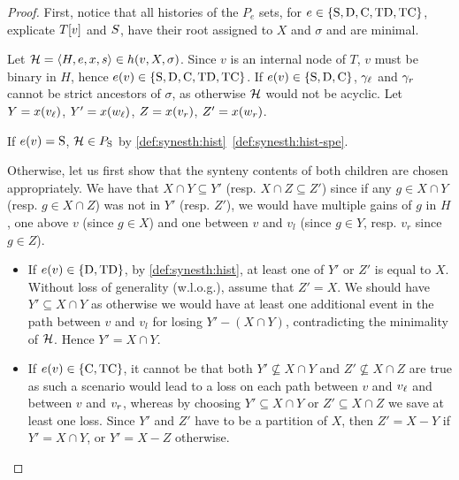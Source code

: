 \begin{proof}
    First, notice that all histories of the \(P_e\) sets,
    for \(e \in \{\mathrm{S},\allowbreak \mathrm{D},\allowbreak \mathrm{C},\allowbreak \mathrm{TD},\allowbreak \mathrm{TC}\}\),
    explicate \(T[v]\) and \(S\),
    have their root assigned to \(X\) and \(\sigma\)
    and are minimal.

    Let \(\mathcal{H} = \left\langle H, e, x, s\right\rangle \in h(v, X, \sigma)\).
    Since \(v\) is an internal node of \(T\), \(v\) must be binary in \(H\), hence \(e(v) \in \{\mathrm{S}, \mathrm{D}, \mathrm{C}, \mathrm{TD}, \mathrm{TC}\}\).
    If \(e(v) \in \{\mathrm{S}, \mathrm{D}, \mathrm{C}\}\), \(\gamma_\mathit{\ell}\) and \(\gamma_r\) cannot be strict ancestors of \(\sigma\), as otherwise \(\mathcal{H}\) would not be acyclic.
    Let \(Y = x(v_\mathit{\ell})\),
    \(Y' = x(w_\mathit{\ell})\),
    \(Z = x(v_r)\),
    \(Z' = x(w_r)\).

    If \(e(v) = \mathrm{S}\),
        \(\mathcal{H} \in P_{\mathrm{S}}\)
        by \cref{def:synesth:hist}~\cref{def:synesth:hist-spe}.

    Otherwise,
        let us first show that the synteny contents of both children are chosen appropriately.
        We have that \(X \cap Y \subseteq Y'\) (resp. \(X \cap Z \subseteq Z'\))
        since if any \(g \in X \cap Y\) (resp. \(g \in X \cap Z\))
        was not in \(Y'\) (resp. \(Z'\)),
        we would have multiple gains of \(g\) in \(H\),
        one above \(v\) (since \(g \in X\))
        and one between \(v\) and \(v_l\) (since \(g \in Y\), resp. \(v_r\) since \(g \in Z\)).
    \begin{itemize}
        \item If \(e(v) \in \{\mathrm{D}, \mathrm{TD}\}\),
            by \cref{def:synesth:hist},
            at least one of \(Y'\) or \(Z'\) is equal to \(X\).
            Without loss of generality (w.l.o.g.), assume that \(Z' = X\).
            We should have \(Y' \subseteq X \cap Y\)
            as otherwise we would have at least one additional event in the path between \(v\) and \(v_l\)
            for losing \(Y' - (X \cap Y)\),
            contradicting the minimality of \(\mathcal{H}\).
            Hence \(Y' = X \cap Y\).

        \item If \(e(v) \in \{\mathrm{C}, \mathrm{TC}\}\),
            it cannot be that both \(Y' \not\subseteq X \cap Y\) and \(Z' \not\subseteq X \cap Z\) are true
            as such a scenario would lead to a loss on each path between \(v\) and \(v_\mathit{\ell}\) and between \(v\) and \(v_r\),
            whereas by choosing \(Y' \subseteq X \cap Y\) or \(Z' \subseteq X \cap Z\) we save at least one loss.
            Since \(Y'\) and \(Z'\) have to be a partition of \(X\), then \(Z' = X - Y\) if \(Y' = X \cap Y\), or \(Y' = X - Z\) otherwise.
    \end{itemize}


\end{proof}
